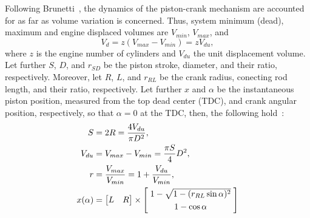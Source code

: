     Following Brunetti~\cite{2012-BrunettiF-Blucher}, the dynamics of the piston-crank mechanism are accounted  for  as  far  as
    volume variation is concerned. Thus, system minimum (dead), maximum and engine displaced volumes are  $V_{min}$,  $V_{max}$,
    and%
    \begin{equation}
        V_d = z(V_{max} - V_{min}) = zV_{du},
        \label{eq:Vd}
    \end{equation}
    \noindent where $z$ is the engine number of cylinders and $V_{du}$ the unit displacement volume. Let further $S$,  $D$,  and
    $r_{SD}$ be the piston stroke, diameter, and their ratio, respectively. Moreover, let $R$, $L$, and $r_{RL}$  be  the  crank
    radius, conecting rod length, and their ratio, respectively. Let further  $x$  and  $\alpha$  be  the  instantaneous  piston
    position, measured from the top dead center (TDC), and crank angular position, respectively, so that $\alpha  =  0$  at  the
    TDC, then, the following hold~\cite{2012-BrunettiF-Blucher, 2017-NaaktgeborenC-IntJMechEngEduc}:%
    \begin{align}
        \label{eq:S}
        S           &= 2R = \frac{4 V_{du}}{\pi D^{2}}, \\
        \label{eq:Vdu}
        V_{du}      &= V_{max} - V_{min} = \frac{\pi S}{4} D^{2}, \\
        \label{eq:r}
        r           &= \frac{V_{max}}{V_{min}} = 1 + \frac{V_{du}}{V_{min}}, \\
        \label{eq:x}
        x(\alpha)   &= \left[
                \begin{matrix}
                    \textstyle L &
                    \textstyle R
                \end{matrix}
            \right]\times\left[
                \begin{matrix}
                    \textstyle \;1 - \sqrt{1 - (r_{RL}\sin\alpha)^2}\; \\[\smallskipamount]
                    \textstyle 1 - \cos\alpha
                \end{matrix}
            \right]
    \end{align}


